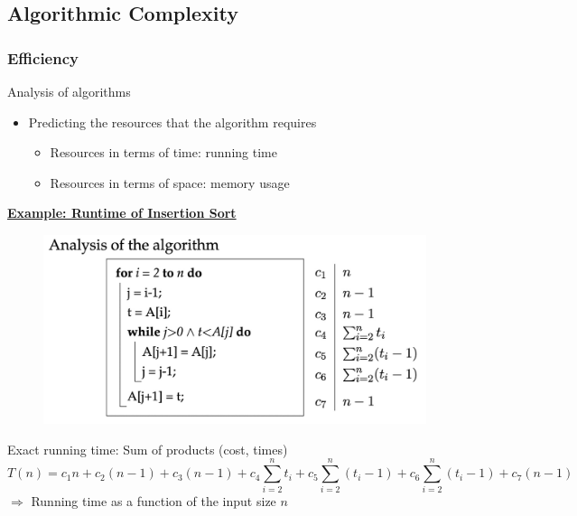 \subsection{Algorithmic Complexity}
\subsubsection{Efficiency}
Analysis of algorithms
\begin{itemize}
    \item Predicting the resources that the algorithm requires
    \begin{itemize}
        \item Resources in terms of time: running time
        \item Resources in terms of space: memory usage
    \end{itemize}
\end{itemize}

\noindent
\textbf{\underline{Example: Runtime of Insertion Sort}} \\
\bigskip

\begin{figure}[H]
    \centering
    \includegraphics[width=0.5\linewidth]{images/Screenshot 2024-05-24 at 13.57.47.jpg}
\end{figure}

Exact running time: Sum of products (cost, times) \[
T(n)=c_1n + c_2(n-1)+c_3(n-1)+c_4\sum_{i=2}^n t_i + c_5 \sum_{i=2}^n (t_i-1) +c_6 \sum_{i=2}^n (t_i-1)+c_7(n-1)
\]
$\Rightarrow$ Running time as a function of the input size $n$ \\

